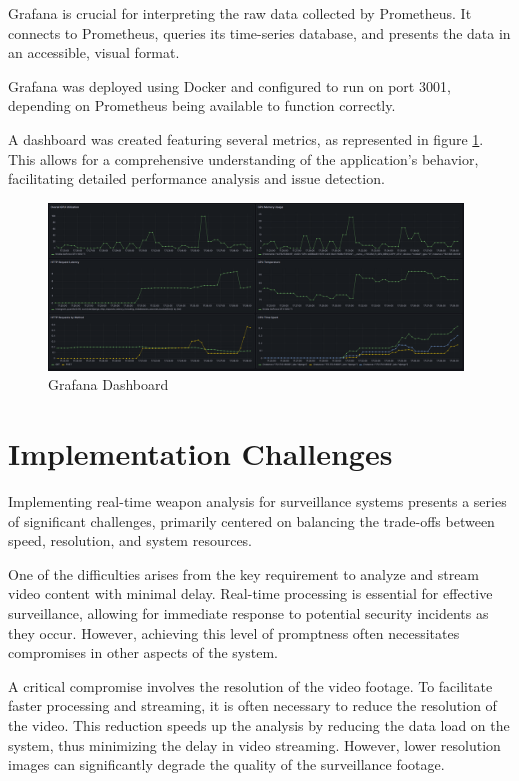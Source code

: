 Grafana is crucial for interpreting the raw data collected by Prometheus. It connects to Prometheus, queries its 
time-series database, and presents the data in an accessible, visual format.

Grafana was deployed using Docker and configured to run on port 3001, depending on Prometheus being available 
to function correctly.

A dashboard was created featuring several metrics, as represented in figure \ref{fig:grafana-dashboard}. This allows for 
a comprehensive understanding of the application's behavior, facilitating detailed performance analysis and issue 
detection.

\begin{figure}[h]
    \centering 
    \includegraphics[width=0.98\textwidth]{figs/grafana-dashboard.png} 
    \caption{Grafana Dashboard}
    \label{fig:grafana-dashboard}
\end{figure}

\section{Implementation Challenges}
Implementing real-time weapon analysis for surveillance systems presents a series of significant challenges, 
primarily centered on balancing the trade-offs between speed, resolution, and system resources.

One of the difficulties arises from the key requirement to analyze and stream video content with minimal delay. 
Real-time processing is essential for effective surveillance, allowing for immediate response to potential security 
incidents as they occur. However, achieving this level of promptness often necessitates compromises in other aspects 
of the system.

A critical compromise involves the resolution of the video footage. To facilitate faster processing and streaming, 
it is often necessary to reduce the resolution of the video. This reduction speeds up the analysis by reducing the 
data load on the system, thus minimizing the delay in video streaming. However, lower resolution images can significantly 
degrade the quality of the surveillance footage.

